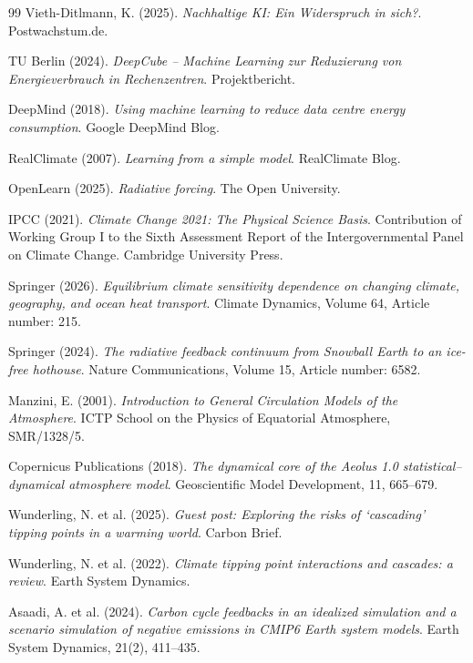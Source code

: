 \documentclass[12pt, a4paper]{article}
\begin{document}
\begin{thebibliography}{99}
		Vieth-Ditlmann, K. (2025). \textit{Nachhaltige KI: Ein Widerspruch in sich?}. Postwachstum.de.
		
		TU Berlin (2024). \textit{DeepCube – Machine Learning zur Reduzierung von Energieverbrauch in Rechenzentren}. Projektbericht.
		
		DeepMind (2018). \textit{Using machine learning to reduce data centre energy consumption}. Google DeepMind Blog.
		
		RealClimate (2007). \textit{Learning from a simple model}. RealClimate Blog.
		
		OpenLearn (2025). \textit{Radiative forcing}. The Open University.
		
		IPCC (2021). \textit{Climate Change 2021: The Physical Science Basis}. Contribution of Working Group I to the Sixth Assessment Report of the Intergovernmental Panel on Climate Change. Cambridge University Press.
		
		Springer (2026). \textit{Equilibrium climate sensitivity dependence on changing climate, geography, and ocean heat transport}. Climate Dynamics, Volume 64, Article number: 215.
		
		Springer (2024). \textit{The radiative feedback continuum from Snowball Earth to an ice-free hothouse}. Nature Communications, Volume 15, Article number: 6582.
		
		Manzini, E. (2001). \textit{Introduction to General Circulation Models of the Atmosphere}. ICTP School on the Physics of Equatorial Atmosphere, SMR/1328/5.
		
		Copernicus Publications (2018). \textit{The dynamical core of the Aeolus 1.0 statistical–dynamical atmosphere model}. Geoscientific Model Development, 11, 665–679.
		
		Wunderling, N. et al. (2025). \textit{Guest post: Exploring the risks of ‘cascading’ tipping points in a warming world}. Carbon Brief.
		
		Wunderling, N. et al. (2022). \textit{Climate tipping point interactions and cascades: a review}. Earth System Dynamics.
		
		Asaadi, A. et al. (2024). \textit{Carbon cycle feedbacks in an idealized simulation and a scenario simulation of negative emissions in CMIP6 Earth system models}. Earth System Dynamics, 21(2), 411–435.
		

\end{thebibliography}
\end{document}

